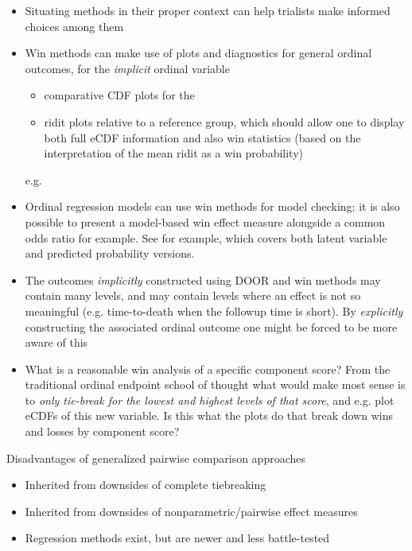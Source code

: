 \documentclass[
  11pt,
  fleqn
]{article}
\begin{document}
\begin{itemize}
  \item Situating methods in their proper context can help
    trialists make informed choices among them
  \item Win methods can make use of
    plots and diagnostics for general ordinal outcomes, for the
    \emph{implicit} ordinal variable
    \begin{itemize}
      \item
        comparative CDF plots for the
      \item ridit plots
        \citep{brossHowUseRidit1958,jansenRiditAnalysisReview1984}
        relative to a reference group, which should allow one to
        display both full eCDF information and also win statistics
        (based on the interpretation of the mean ridit as a win probability)
    \end{itemize}e.g.
  \item Ordinal regression models can use win methods for model
    checking; it is
    also possible to present a model-based win effect measure
    alongside a common
    odds ratio for example. See
    \citep{agrestiOrdinalProbabilityEffect2017} for example, which
    covers both latent variable and predicted probability versions.
  \item The outcomes \emph{implicitly} constructed using
    DOOR and win methods may contain many levels, and may contain
    levels where an
    effect is not so meaningful (e.g. time-to-death when the followup time is
    short). By \emph{explicitly} constructing the associated
    ordinal outcome one
    might be forced to be more aware of this
  \item What is a reasonable win
    analysis of a specific component score? From the traditional
    ordinal endpoint
    school of thought what would make most sense is to \emph{only
      tie-break for the
    lowest and highest levels of that score}, and e.g. plot eCDFs of this new
    variable. Is this what the plots do that break down wins and losses by
    component score?
\end{itemize}

Disadvantages of generalized pairwise comparison approaches
\begin{itemize}
  \item Inherited from downsides of complete tiebreaking
  \item Inherited from downsides of nonparametric/pairwise effect measures
  \item Regression methods exist, but are newer and less battle-tested
\end{itemize}
\end{document}
